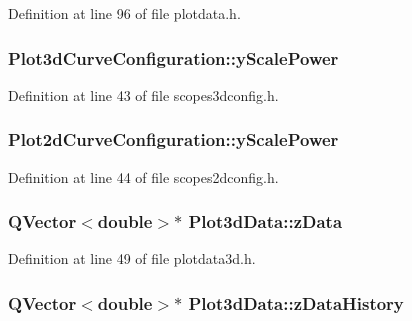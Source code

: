 Definition at line 96 of file plotdata.\-h.

\hypertarget{group___scope_plugin_gafedb70e83328587c7a6e336f7899a247}{
\subsubsection[{y\-Scale\-Power}]{ Plot3d\-Curve\-Configuration\-::y\-Scale\-Power}}\label{group___scope_plugin_gafedb70e83328587c7a6e336f7899a247}


Definition at line 43 of file scopes3dconfig.\-h.

\hypertarget{group___scope_plugin_ga42557670a9e1e7f792d3ecb795387425}{
\subsubsection[{y\-Scale\-Power}]{ Plot2d\-Curve\-Configuration\-::y\-Scale\-Power}}\label{group___scope_plugin_ga42557670a9e1e7f792d3ecb795387425}


Definition at line 44 of file scopes2dconfig.\-h.

\hypertarget{group___scope_plugin_gad5607d9145f51871817c4094cd1ba250}{
\subsubsection[{z\-Data}]{\setlength{\rightskip}{0pt plus 5cm}Q\-Vector$<${\bf double}$>$$\ast$ Plot3d\-Data\-::z\-Data}}\label{group___scope_plugin_gad5607d9145f51871817c4094cd1ba250}


Definition at line 49 of file plotdata3d.\-h.

\hypertarget{group___scope_plugin_gab1e0ead20c4c64f78a8dafc2ae101710}{
\subsubsection[{z\-Data\-History}]{\setlength{\rightskip}{0pt plus 5cm}Q\-Vector$<${\bf double}$>$$\ast$ Plot3d\-Data\-::z\-Data\-History}}\label{group___scope_plugin_gab1e0ead20c4c64f78a8dafc2ae101710}


